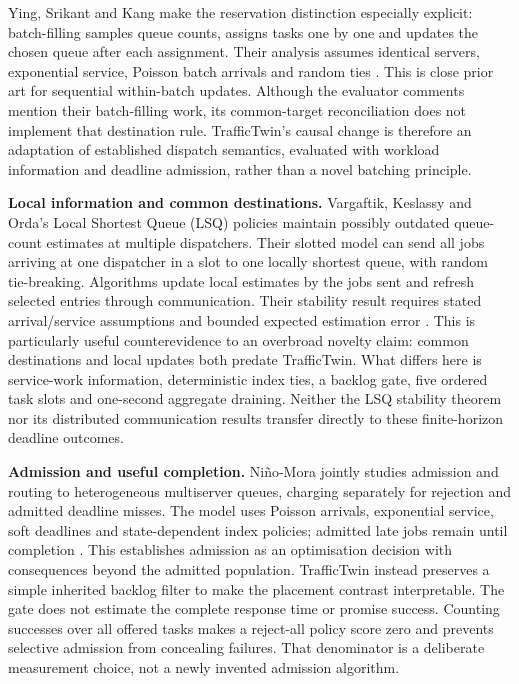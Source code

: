 \documentclass[11pt,a4paper]{article}
\begin{document}
Ying, Srikant and Kang make the reservation distinction especially explicit: batch-filling samples queue counts, assigns tasks one by one and updates the chosen queue after each assignment. Their analysis assumes identical servers, exponential service, Poisson batch arrivals and random ties \cite{ref13}. This is close prior art for sequential within-batch updates. Although the evaluator comments mention their batch-filling work, its common-target reconciliation does not implement that destination rule. TrafficTwin's causal change is therefore an adaptation of established dispatch semantics, evaluated with workload information and deadline admission, rather than a novel batching principle.

\textbf{Local information and common destinations.} Vargaftik, Keslassy and Orda's Local Shortest Queue (LSQ) policies maintain possibly outdated queue-count estimates at multiple dispatchers. Their slotted model can send all jobs arriving at one dispatcher in a slot to one locally shortest queue, with random tie-breaking. Algorithms update local estimates by the jobs sent and refresh selected entries through communication. Their stability result requires stated arrival/service assumptions and bounded expected estimation error \cite{ref10}. This is particularly useful counterevidence to an overbroad novelty claim: common destinations and local updates both predate TrafficTwin. What differs here is service-work information, deterministic index ties, a backlog gate, five ordered task slots and one-second aggregate draining. Neither the LSQ stability theorem nor its distributed communication results transfer directly to these finite-horizon deadline outcomes.

\textbf{Admission and useful completion.} Niño-Mora jointly studies admission and routing to heterogeneous multiserver queues, charging separately for rejection and admitted deadline misses. The model uses Poisson arrivals, exponential service, soft deadlines and state-dependent index policies; admitted late jobs remain until completion \cite{ref11}. This establishes admission as an optimisation decision with consequences beyond the admitted population. TrafficTwin instead preserves a simple inherited backlog filter to make the placement contrast interpretable. The gate does not estimate the complete response time or promise success. Counting successes over all offered tasks makes a reject-all policy score zero and prevents selective admission from concealing failures. That denominator is a deliberate measurement choice, not a newly invented admission algorithm.
\end{document}
